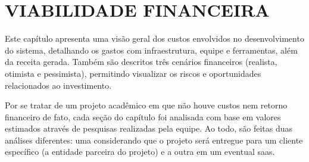 \chapter{VIABILIDADE FINANCEIRA}

Este capítulo apresenta uma visão geral dos custos envolvidos no desenvolvimento do sistema, detalhando os gastos com infraestrutura, equipe e ferramentas, além da receita gerada. Também são descritos três cenários financeiros (realista, otimista e pessimista), permitindo visualizar os riscos e oportunidades relacionados ao investimento.

Por se tratar de um projeto acadêmico em que não houve custos nem retorno financeiro de fato, cada seção do capítulo foi analisada com base em valores estimados através de pesquisas realizadas pela equipe. Ao todo, são feitas duas análises diferentes: uma considerando que o projeto será entregue para um cliente específico (a entidade parceira do projeto) e a outra em um eventual \gls{saas}.






